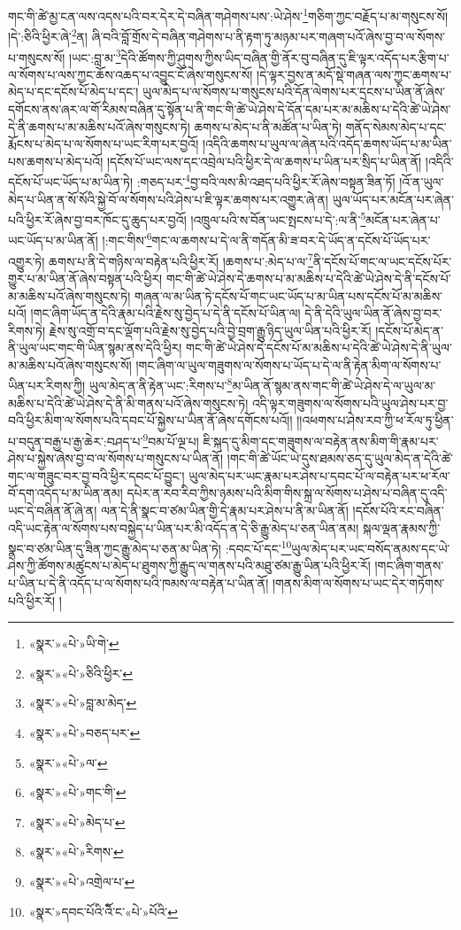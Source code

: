 གང་གི་ཚེ་མྱ་ངན་ལས་འདས་པའི་བར་དེར་དེ་བཞིན་གཤེགས་པས་:ཡེ་ཤེས་\footnote{«སྣར་»«པེ་»ཡི་གེ་}གཅིག་ཀྱང་བརྗོད་པ་མ་གསུངས་སོ། །དེ་:ཅིའི་ཕྱིར་ཞེ་\footnote{«སྣར་»«པེ་»ཅིའི་ཕྱིར་}ན། ཞི་བའི་བློ་གྲོས་དེ་བཞིན་གཤེགས་པ་ནི་རྟག་ཏུ་མཉམ་པར་གཞག་པའོ་ཞེས་བྱ་བ་ལ་སོགས་པ་གསུངས་སོ། །ཡང་:བླ་མ་\footnote{«སྣར་»«པེ་»བླ་མ་མེད་}དེའི་ཚོགས་ཀྱི་ཤུགས་ཀྱིས་ཡིད་བཞིན་གྱི་ནོར་བུ་བཞིན་དུ་ཇི་ལྟར་འདོད་པར་རྩིག་པ་ལ་སོགས་པ་ལས་ཀྱང་ཆོས་འཆད་པ་འབྱུང་ངོ་ཞེས་གསུངས་སོ། །དེ་ལྟར་བྱས་ན་མདོ་སྡེ་གཞན་ལས་ཀྱང་ཆགས་པ་མེད་པ་དང་དངོས་པོ་མེད་པ་དང་། ཡུལ་མེད་པ་ལ་སོགས་པ་གསུངས་པའི་དོན་ལེགས་པར་དྲངས་པ་ཡིན་ནོ་ཞེས་དགོངས་ནས་ཞར་ལ་གོ་རིམས་བཞིན་དུ་སྟོན་པ་ནི་གང་གི་ཚེ་ཡེ་ཤེས་དེ་དོན་དམ་པར་མ་མཆིས་པ་དེའི་ཚེ་ཡེ་ཤེས་དེ་ནི་ཆགས་པ་མ་མཆིས་པའོ་ཞེས་གསུངས་ཏེ། ཆགས་པ་མེད་པ་ནི་མཚོན་པ་ཡིན་ཏེ། གནོད་སེམས་མེད་པ་དང་རྨོངས་པ་མེད་པ་ལ་སོགས་པ་ཡང་རིག་པར་བྱའོ། །འདིའི་ཆགས་པ་ཡུལ་ལ་ཞེན་པའི་འདོད་ཆགས་ཡོད་པ་མ་ཡིན་པས་ཆགས་པ་མེད་པའོ། །དངོས་པོ་ཡང་ལས་དང་འབྲེལ་པའི་ཕྱིར་དེ་ལ་ཆགས་པ་ཡིན་པར་སྲིད་པ་ཡིན་ནོ། །འདིའི་དངོས་པོ་ཡང་ཡོད་པ་མ་ཡིན་ཏེ། :གཅད་པར་\footnote{«སྣར་»«པེ་»བཅད་པར་}བྱ་བའི་ལས་མི་འཐད་པའི་ཕྱིར་རོ་ཞེས་བསྟན་ཟིན་ཏོ། །འོ་ན་ཡུལ་མེད་པ་ཡིན་ན་སོ་སོའི་སྐྱེ་བོ་ལ་སོགས་པའི་ཤེས་པ་ཇི་ལྟར་ཆགས་པར་འགྱུར་ཞེ་ན། ཡུལ་ཡོད་པར་མངོན་པར་ཞེན་པའི་ཕྱིར་རོ་ཞེས་བྱ་བར་ཁོང་དུ་ཆུད་པར་བྱའོ། །འཁྲུལ་པའི་ས་བོན་ཡང་སྤངས་པ་དེ་:ལ་ནི་\footnote{«སྣར་»«པེ་»ལ་}མངོན་པར་ཞེན་པ་ཡང་ཡོད་པ་མ་ཡིན་ནོ། །:གང་གིས་\footnote{«སྣར་»«པེ་»གང་གི་}གང་ལ་ཆགས་པ་དེ་ལ་ནི་གདོན་མི་ཟ་བར་དེ་ཡོད་ན་དངོས་པོ་ཡོད་པར་འགྱུར་ཏེ། ཆགས་པ་ནི་དེ་གཉིས་ལ་བརྟེན་པའི་ཕྱིར་རོ། །ཆགས་པ་:མེད་པ་ལ་\footnote{«སྣར་»«པེ་»མེད་པ་}ནི་དངོས་པོ་གང་ལ་ཡང་དངོས་པོར་གྱུར་པ་མ་ཡིན་ནོ་ཞེས་བསྟན་པའི་ཕྱིར། གང་གི་ཚེ་ཡེ་ཤེས་དེ་ཆགས་པ་མ་མཆིས་པ་དེའི་ཚེ་ཡེ་ཤེས་དེ་ནི་དངོས་པོ་མ་མཆིས་པའོ་ཞེས་གསུངས་ཏེ། གཞན་ལ་མ་ཡིན་ཏེ་དངོས་པོ་གང་ཡང་ཡོད་པ་མ་ཡིན་པས་དངོས་པོ་མ་མཆིས་པའོ། །གང་ཞིག་ཡོད་ན་དེའི་རྣམ་པའི་རྗེས་སུ་བྱེད་པ་དེ་ནི་དངོས་པོ་ཡིན་ལ། དེ་ནི་དེའི་ཡུལ་ཡིན་ནོ་ཞེས་བྱ་བར་རིགས་ཏེ། རྗེས་སུ་འགྲོ་བ་དང་ལྡོག་པའི་རྗེས་སུ་བྱེད་པའི་བྱེ་བྲག་རྒྱུ་ཉིད་ཡུལ་ཡིན་པའི་ཕྱིར་རོ། །དངོས་པོ་མེད་ན་ནི་ཡུལ་ཡང་གང་གི་ཡིན་སྙམ་ནས་དེའི་ཕྱིར། གང་གི་ཚེ་ཡེ་ཤེས་དེ་དངོས་པོ་མ་མཆིས་པ་དེའི་ཚེ་ཡེ་ཤེས་དེ་ནི་ཡུལ་མ་མཆིས་པའོ་ཞེས་གསུངས་སོ། །གང་ཞིག་ལ་ཡུལ་གཟུགས་ལ་སོགས་པ་ཡོད་པ་དེ་ལ་ནི་རྟེན་མིག་ལ་སོགས་པ་ཡིན་པར་རིགས་ཀྱི། ཡུལ་མེད་ན་ནི་རྟེན་ཡང་:རིགས་པ་\footnote{«སྣར་»«པེ་»རིགས་}མ་ཡིན་ནོ་སྙམ་ནས་གང་གི་ཚེ་ཡེ་ཤེས་དེ་ལ་ཡུལ་མ་མཆིས་པ་དེའི་ཚེ་ཡེ་ཤེས་དེ་ནི་མི་གནས་པའོ་ཞེས་གསུངས་ཏེ། འདི་ལྟར་གཟུགས་ལ་སོགས་པའི་ཡུལ་ཤེས་པར་བྱ་བའི་ཕྱིར་མིག་ལ་སོགས་པའི་དབང་པོ་སྐྱེས་པ་ཡིན་ནོ་ཞེས་དགོངས་པའོ།། །།འཕགས་པ་ཤེས་རབ་ཀྱི་ཕ་རོལ་ཏུ་ཕྱིན་པ་བདུན་བརྒྱ་པ་རྒྱ་ཆེར་:བཤད་པ་\footnote{«སྣར་»«པེ་»འགྲེལ་པ་}བམ་པོ་ལྔ་པ། ཇི་སྐད་དུ་མིག་དང་གཟུགས་ལ་བརྟེན་ནས་མིག་གི་རྣམ་པར་ཤེས་པ་སྐྱེས་ཞེས་བྱ་བ་ལ་སོགས་པ་གསུངས་པ་ཡིན་ནོ། །གང་གི་ཚེ་ཡོང་ཡེ་དུས་ཐམས་ཅད་དུ་ཡུལ་མེད་ན་དེའི་ཚེ་གང་ལ་གཟུང་བར་བྱ་བའི་ཕྱིར་དབང་པོ་བྱུང་། ཡུལ་མེད་པར་ཡང་རྣམ་པར་ཤེས་པ་དབང་པོ་ལ་བརྟེན་པར་ཕ་རོལ་བོ་དག་འདོད་པ་མ་ཡིན་ནམ། དཔེར་ན་རབ་རིབ་ཀྱིས་ཉམས་པའི་མིག་གིས་སྐྲ་ལ་སོགས་པ་ཤེས་པ་བཞིན་དུ་འདི་ཡང་དེ་བཞིན་ནོ་ཞེ་ན། ལན་དེ་ནི་སྣང་བ་ཙམ་ཡིན་གྱི་དེ་རྣམ་པར་ཤེས་པ་ནི་མ་ཡིན་ནོ། །དངོས་པོའི་རང་བཞིན་འདི་ཡང་རྟེན་ལ་སོགས་པས་བསྐྱེད་པ་ཡིན་པར་མི་འདོད་ན་དེ་ཅི་རྒྱུ་མེད་པ་ཅན་ཡིན་ནམ། སྐལ་ལྡན་རྣམས་ཀྱི་སྣང་བ་ཙམ་ཡིན་དུ་ཟིན་ཀྱང་རྒྱུ་མེད་པ་ཅན་མ་ཡིན་ཏེ། :དབང་པོ་དང་\footnote{«སྣར་»དབང་པོའི་ོའི་ང་«པེ་»པོའི་}ཡུལ་མེད་པར་ཡང་བསོད་ནམས་དང་ཡེ་ཤེས་ཀྱི་ཚོགས་མཚུངས་པ་མེད་པ་ཐུགས་ཀྱི་རྒྱུད་ལ་གནས་པའི་མཐུ་ཙམ་རྒྱུ་ཡིན་པའི་ཕྱིར་རོ། །གང་ཞིག་གནས་པ་ཡིན་པ་དེ་ནི་འདོད་པ་ལ་སོགས་པའི་ཁམས་ལ་བརྟེན་པ་ཡིན་ནོ། །གནས་མིག་ལ་སོགས་པ་ཡང་དེར་གཏོགས་པའི་ཕྱིར་རོ། །
